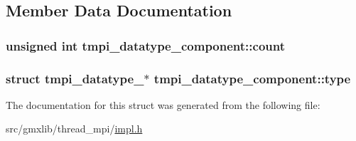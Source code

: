 \subsection{\-Member \-Data \-Documentation}
\hypertarget{structtmpi__datatype__component_a40d703efc84f28175f2747bd8b4e6e4b}{
\subsubsection[{count}]{\setlength{\rightskip}{0pt plus 5cm}unsigned int {\bf tmpi\-\_\-datatype\-\_\-component\-::count}}}\label{structtmpi__datatype__component_a40d703efc84f28175f2747bd8b4e6e4b}
\hypertarget{structtmpi__datatype__component_a1787aab608b6116c05d11179a512e8b4}{
\subsubsection[{type}]{\setlength{\rightskip}{0pt plus 5cm}struct {\bf tmpi\-\_\-datatype\-\_\-}$\ast$ {\bf tmpi\-\_\-datatype\-\_\-component\-::type}}}\label{structtmpi__datatype__component_a1787aab608b6116c05d11179a512e8b4}


\-The documentation for this struct was generated from the following file\-:\begin{DoxyCompactItemize}
\item 
src/gmxlib/thread\-\_\-mpi/\hyperlink{impl_8h}{impl.\-h}\end{DoxyCompactItemize}
